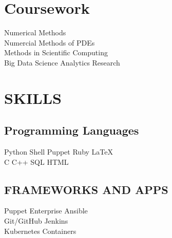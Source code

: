 \documentclass[]{deedy-resume-openfont}
\begin{document}
\begin{minipage}[t]{0.33\textwidth}

\section{Coursework}
Numerical Methods \\
Numercial Methods of PDEs \\
Methods in Scientific Computing \\
Big Data Science Analytics Research \\
\sectionsep


\section{SKILLS}
\subsection{Programming Languages}
Python \textbullet{}   Shell \textbullet{} Puppet \textbullet{}
Ruby \textbullet{} \LaTeX\ \\ 
C \textbullet{} C++ \textbullet{} SQL \textbullet{} HTML
\sectionsep

\subsection{FRAMEWORKS AND APPS} 
    Puppet Enterprise \textbullet{} Ansible \\
    Git/GitHub \textbullet{} Jenkins \\
    Kubernetes \textbullet{} Containers
\sectionsep
\newpage

%
%

\end{minipage}
\hfill
\end{document}
